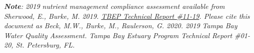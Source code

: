 \documentclass[final,t]{beamer}\usepackage[]{graphicx}\usepackage[]{color}
\begin{document}
\begin{frame}
\begin{columns}[t]
\begin{column}{.79\linewidth}
\vspace{-0.12in}

\tiny \textit{\textbf{Note}: 2019 nutrient management compliance assessment available from Sherwood, E., Burke, M. 2019. \href{http://www.tbeptech.org/TBEP_TECH_PUBS/2019/TBEP_11-19_TBNMC_2018_RA_Annual_Assessment.pdf}{TBEP Technical Report \#11-19}.  Please cite this document as Beck, M.W., Burke, M., Raulerson, G. 2020. 2019 Tampa Bay Water Quality Assessment. Tampa Bay Estuary Program Technical Report \#01-20, St. Petersburg, FL.} \\

\end{column}

\end{columns}

\end{frame}
\end{document}
